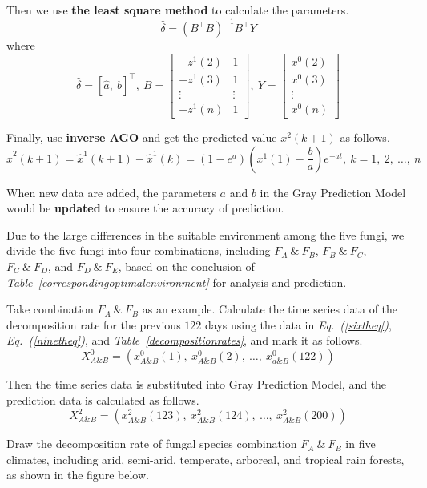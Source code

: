 \par
Then we use \textbf{the least square method} to calculate the parameters.
\begin{equation}
  \hat{\delta} = (B^\top B)^{-1}B^\top Y
\end{equation}
where
$$\hat{\delta} = [\hat{a},\ \hat{b}]^\top,\ B=\left[ \begin{array}{cc}
      -z^1(2) & 1      \\
      -z^1(3) & 1      \\
      \vdots  & \vdots \\
      -z^1(n) & 1
    \end{array}
    \right],\ Y=\left[ \begin{array}{c}
      x^0(2) \\
      x^0(3) \\
      \vdots \\
      x^0(n)
    \end{array}
    \right]$$
\par
Finally, use \textbf{inverse AGO} and get the predicted value $x^2(k+1)$ as follows.
$$\hat{x}^2(k+1) = \hat{x}^1(k+1) - \hat{x}^1(k) = (1-e^a)(x^1(1) - \frac{b}{a})e^{-at},\ k = 1,\ 2,\ \ldots,\ n$$
\par
When new data are added, the parameters $a$ and $b$ in the Gray Prediction Model would be \textbf{updated} to ensure the accuracy of prediction.
\par
Due to the large differences in the suitable environment among the five fungi, we divide the five fungi into four combinations, including $F_A\ \&\ F_B$, $F_B\ \&\ F_C$, $F_C\ \&\ F_D$, and $F_D\ \&\ F_E$, based on the conclusion of \textit{Table~\ref{correspondingoptimalenvironment}} for analysis and prediction.
\par
Take combination $F_A\ \&\ F_B$ as an example. Calculate the time series data of the decomposition rate for the previous $122$ days using the data in \textit{Eq.~(\ref{sixtheq})}, \textit{Eq.~(\ref{ninetheq})}, and \textit{Table~\ref{decompositionrates}}, and mark it as follows.
$$X^0_{A\&B} = (x^0_{A\&B}(1),\ x^0_{A\&B}(2),\ \ldots,\ x^0_{a\&B}(122))$$
\par
Then the time series data is substituted into Gray Prediction Model, and the prediction data is calculated as follows.
$$X^2_{A\&B}=(x^2_{A\&B}(123),\ x^2_{A\&B}(124),\ \ldots,\ x^2_{A\&B}(200))$$
\par
Draw the decomposition rate of fungal species combination $F_A\ \&\ F_B$ in five climates, including arid, semi-arid, temperate, arboreal, and tropical rain forests, as shown in the figure below.
